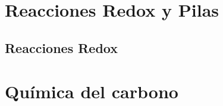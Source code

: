 \documentclass[
    11pt, %
    a4paper, %
]{LegrandOrangeBookES}
\begin{document}
    

    \newpage

    




    \part{Reacciones Redox y Pilas}


    \chapterspaceabove{6.75cm} %
    \chapterspacebelow{7.25cm} %


%

    \chapter{Reacciones Redox}

    

    \newpage

    



    \part{Química del carbono}


    \chapterspaceabove{6.75cm} %
    \chapterspacebelow{7.25cm} %
\end{document}
